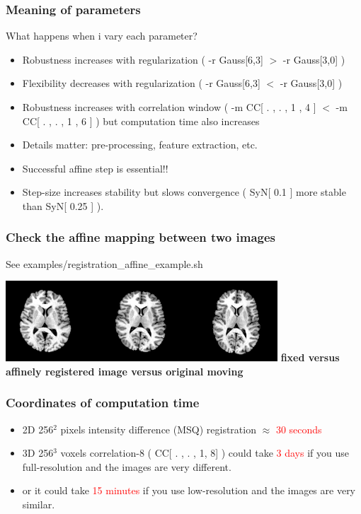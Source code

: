 \documentclass[18pt]{beamer}
\begin{document}
\begin{frame}
\frametitle{Meaning of parameters}
\Large What happens when i vary each parameter?
\begin{itemize}
\item Robustness increases with regularization ( -r Gauss[6,3] $>$ -r
  Gauss[3,0] )
\pause
\item Flexibility decreases with regularization ( -r Gauss[6,3] $<$ -r
  Gauss[3,0] )
\pause
\item Robustness increases with correlation window ( -m CC[ . , . , 1
  , 4 ] $<$  -m CC[ . , . , 1
  , 6 ]  )  but computation time also increases
\pause
\item Details matter:  pre-processing, feature extraction, etc. 
\pause
\item Successful affine step is essential!!
\pause
\item Step-size increases stability but slows convergence ( SyN[ 0.1 ]
  more stable than SyN[ 0.25 ] ).
\end{itemize}
\end{frame}

\begin{frame}
\frametitle{Check the affine mapping between two images}
See  examples/registration\_affine\_example.sh

\begin{center}
\includegraphics[width=4in]{../figures/r64registrationaffine.jpg}\newline
{\bf fixed   versus affinely registered image versus original moving}
\end{center}
\end{frame}

\begin{frame}
\frametitle{Coordinates of computation time}
\begin{Large}
\begin{itemize}
\item 2D 256$^2$ pixels intensity difference (MSQ) registration
  $\approx$ \textcolor{red}{30 seconds}
\pause
\item 3D 256$^3$ voxels correlation-8 ( CC[ . , . , 1,
8] ) could take \textcolor{red}{3 days} if you use full-resolution and the images are
very different.
\pause
\item  or it could take \textcolor{red}{15 minutes} if you use low-resolution and the
  images are very similar.
\end{itemize}
\end{Large}
\end{frame}
\end{document}
